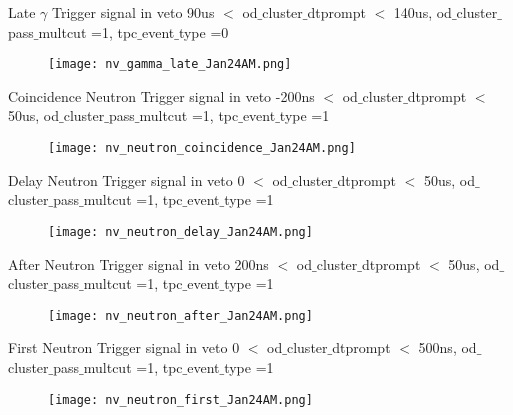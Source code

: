 \documentclass[9pt]{beamer}
\begin{document}
\begin{frame}{Late $\gamma$ Trigger signal in veto}
90us $<$ od$\_$cluster$\_$dtprompt $<$ 140us, od$\_$cluster$\_$pass$\_$multcut =1,  tpc$\_$event$\_$type =0

\begin{figure}
\texttt{[image: nv\_gamma\_late\_Jan24AM.png]}
\end{figure}
\end{frame}


\begin{frame}{Coincidence Neutron Trigger signal in veto}
-200ns $<$ od$\_$cluster$\_$dtprompt $<$ 50us, od$\_$cluster$\_$pass$\_$multcut =1,  tpc$\_$event$\_$type =1

\begin{figure}
\texttt{[image: nv\_neutron\_coincidence\_Jan24AM.png]}
\end{figure}
\end{frame}

\begin{frame}{Delay Neutron Trigger signal in veto}
0 $<$ od$\_$cluster$\_$dtprompt $<$ 50us, od$\_$cluster$\_$pass$\_$multcut =1,  tpc$\_$event$\_$type =1

\begin{figure}
\texttt{[image: nv\_neutron\_delay\_Jan24AM.png]}
\end{figure}
\end{frame}

\begin{frame}{After Neutron Trigger signal in veto}
200ns $<$ od$\_$cluster$\_$dtprompt $<$ 50us, od$\_$cluster$\_$pass$\_$multcut =1,  tpc$\_$event$\_$type =1

\begin{figure}
\texttt{[image: nv\_neutron\_after\_Jan24AM.png]}
\end{figure}
\end{frame}

\begin{frame}{First Neutron Trigger signal in veto}
0 $<$ od$\_$cluster$\_$dtprompt $<$ 500ns, od$\_$cluster$\_$pass$\_$multcut =1,  tpc$\_$event$\_$type =1

\begin{figure}
\texttt{[image: nv\_neutron\_first\_Jan24AM.png]}
\end{figure}
\end{frame}
\end{document}
